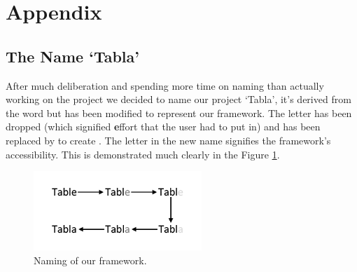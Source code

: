 \documentclass[10pt,journal,compsoc]{IEEEtran}
\begin{document}


\section{Appendix}\label{appendix-title-1b8525ae1891}
\subsection{The Name `Tabla'}
After much deliberation and spending more time on naming than actually working on the project we decided to name our project `Tabla', it's derived from the word  but has been modified to represent our framework. The letter  has been dropped (which signified \textbf{e}ffort that the user had to put in) and has been replaced by  to create . The letter  in the new name signifies the framework's accessibility. This is demonstrated much clearly in the Figure \ref{fig:naming}.


\begin{figure}[!t]
\centering
\includegraphics[width=2.5in]{figures/naming.pdf}
\caption{Naming of our framework.}
\label{fig:naming}
\end{figure}
     
\end{document}

